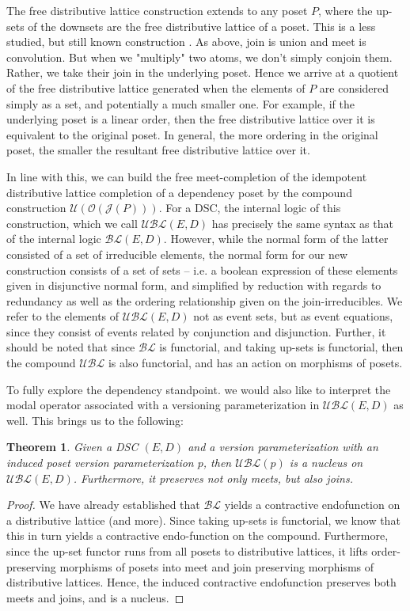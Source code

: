 \documentclass[hoptionsi,review,format=acmsmall]{acmart}
\newtheorem{theorem}{Theorem}[section]
\theoremstyle{definition}
\newcommand{\UBLc}{\mathcal{UBL}}
\newcommand{\Oc}{\mathcal{O}}
\newcommand{\Ucc}{\mathcal{U}}
\newcommand{\Jc}{\mathcal{J}}
\newcommand{\BLc}{\mathcal{BL}}
\begin{document}
The free distributive lattice construction extends to any poset \(P\), where the up-sets of the downsets are the free distributive lattice of a poset. This is a less studied, but still known construction \cite{johnstone1982stone}. As above, join is union and meet is convolution. But when we "multiply" two atoms, we don't simply conjoin them. Rather, we take their join in the underlying poset. Hence we arrive at a quotient of the free distributive lattice generated when the elements of \(P\) are considered simply as a set, and potentially a much smaller one. For example, if the underlying poset is a linear order, then the free distributive lattice over it is equivalent to the original poset. In general, the more ordering in the original poset, the smaller the resultant free distributive lattice over it.

 In line with this, we can build the free meet-completion of the idempotent distributive lattice completion of a dependency poset by the compound construction \(\Ucc(\Oc(\Jc(P)))\). For a DSC, the internal logic of this construction, which we call \(\UBLc(E,D)\) has precisely the same syntax as that of the internal logic \(\BLc(E,D)\). However, while the normal form of the latter consisted of a set of irreducible elements, the normal form for our new construction consists of a set of sets -- i.e. a boolean expression of these elements given in disjunctive normal form, and simplified by reduction with regards to redundancy as well as the ordering relationship given on the join-irreducibles. We refer to the elements of \(\UBLc(E,D)\) not as event sets, but as event equations, since they consist of events related by conjunction and disjunction. Further, it should be noted that since \(\BLc\) is functorial, and taking up-sets is functorial, then the compound \(\UBLc\) is also functorial, and has an action on morphisms of posets.
 


To fully explore the dependency standpoint. we would also like to interpret the modal operator associated with a versioning parameterization in \(\UBLc(E,D)\) as well. This brings us to the following:

\begin{theorem}
Given a DSC \((E,D)\) and a version parameterization with an induced poset version parameterization \(p\), then \(\UBLc(p)\) is a nucleus on \(\UBLc(E,D)\). Furthermore, it preserves not only meets, but also joins.
\end{theorem}
\begin{proof}
We have already established that \(\BLc\) yields a contractive endofunction on a distributive lattice (and more). Since taking up-sets is functorial, we know that this in turn yields a contractive endo-function on the compound. Furthermore, since the up-set functor runs from all posets to distributive lattices, it lifts order-preserving morphisms of posets into meet and join preserving morphisms of distributive lattices. Hence, the induced contractive endofunction preserves both meets and joins, and is a nucleus.
\end{proof}
\end{document}
